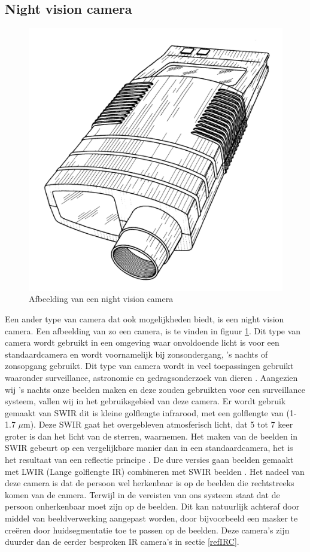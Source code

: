 \subsection{Night vision camera}
\label{refNVC}
\begin{figure}[hbp]
	\includegraphics[scale=0.075]{NightVisionCamera}
	\caption{Afbeelding van een night vision camera}
	\label{imgNVC}
\end{figure}
Een ander type van camera dat ook mogelijkheden biedt, is een night vision camera. Een afbeelding van zo een camera, is te vinden in figuur \ref{imgNVC}\cite{bibNVC}.
Dit type van camera wordt gebruikt in een omgeving waar onvoldoende licht is voor een standaardcamera en wordt voornamelijk bij zonsondergang, 's nachts of zonsopgang gebruikt. Dit type van camera wordt in veel toepassingen gebruikt waaronder surveillance, astronomie en gedragsonderzoek van dieren \cite{bibNVC2}. Aangezien wij 's nachts onze beelden maken en deze zouden gebruikten voor een surveillance systeem, vallen wij in het gebruiksgebied van deze camera. Er wordt gebruik gemaakt van SWIR dit is kleine golflengte infrarood, met een golflengte van (1-1.7 $\mu$m). Deze SWIR gaat het overgebleven atmosferisch licht, dat 5 tot 7 keer groter is dan het licht van de sterren, waarnemen. Het maken van de beelden in SWIR gebeurt op een vergelijkbare manier dan in een standaardcamera, het is het resultaat van een reflectie principe . De dure versies gaan beelden gemaakt met LWIR (Lange golflengte IR) combineren met SWIR beelden \cite{bibNVC2}. Het nadeel van deze camera is dat de persoon wel herkenbaar is op de beelden die rechtstreeks komen van de camera. Terwijl in de vereisten van ons systeem staat dat de persoon onherkenbaar moet zijn op de beelden. Dit kan natuurlijk achteraf door middel van beeldverwerking aangepast worden, door bijvoorbeeld een masker te cre\"eren door huidsegmentatie toe te passen op de beelden. Deze camera's zijn duurder dan de eerder besproken IR camera's in sectie \ref{refIRC}.

